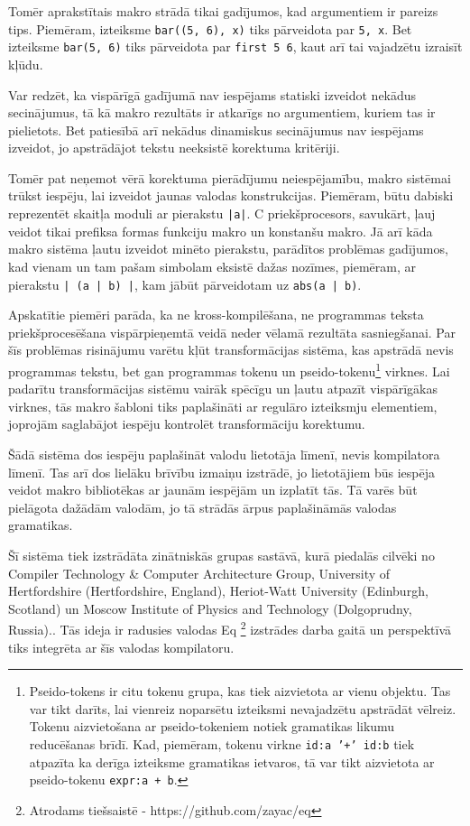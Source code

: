 Tomēr aprakstītais makro strādā tikai gadījumos, kad argumentiem ir pareizs tips. Piemēram, izteiksme \verb|bar((5, 6), x)| tiks pārveidota par \verb|5, x|. Bet izteiksme \verb|bar(5, 6)| tiks pārveidota par \verb|first 5 6|, kaut arī tai vajadzētu izraisīt kļūdu.

Var redzēt, ka vispārīgā gadījumā nav iespējams statiski izveidot nekādus secinājumus, tā kā makro rezultāts ir atkarīgs no argumentiem, kuriem tas ir pielietots. Bet patiesībā arī nekādus dinamiskus secinājumus nav iespējams izveidot, jo apstrādājot tekstu neeksistē korektuma kritēriji.

Tomēr pat neņemot vērā korektuma pierādījumu neiespējamību, makro sistēmai trūkst iespēju, lai izveidot jaunas valodas konstrukcijas. Piemēram, būtu dabiski reprezentēt skaitļa moduli ar pierakstu \verb/|a|/. C priekšprocesors, savukārt, ļauj veidot tikai prefiksa formas funkciju makro un konstanšu makro. Jā arī kāda makro sistēma ļautu izveidot minēto pierakstu, parādītos problēmas gadījumos, kad vienam un tam pašam simbolam eksistē dažas nozīmes, piemēram, ar pierakstu \verb/| (a | b) |/, kam jābūt pārveidotam uz \verb/abs(a | b)/.

Apskatītie piemēri parāda, ka ne kross-kompilēšana, ne programmas teksta priekšprocesēšana vispārpieņemtā veidā neder vēlamā rezultāta sasniegšanai. Par šīs problēmas risinājumu varētu kļūt transformācijas sistēma, kas apstrādā nevis programmas tekstu, bet gan programmas tokenu un pseido-tokenu\footnote{Pseido-tokens ir citu tokenu grupa, kas tiek aizvietota ar vienu objektu. Tas var tikt darīts, lai vienreiz noparsētu izteiksmi nevajadzētu apstrādāt vēlreiz. Tokenu aizvietošana ar pseido-tokeniem notiek gramatikas likumu reducēšanas brīdī. Kad, piemēram, tokenu virkne \texttt{{id:a} '+' {id:b}} tiek atpazīta ka derīga izteiksme gramatikas ietvaros, tā var tikt aizvietota ar pseido-tokenu \texttt{{expr:a + b}}.} virknes. Lai padarītu transformācijas sistēmu vairāk spēcīgu un ļautu atpazīt vispārīgākas virknes, tās makro šabloni tiks paplašināti ar regulāro izteiksmju elementiem, joprojām saglabājot iespēju kontrolēt transformāciju korektumu.

Šādā sistēma dos iespēju paplašināt valodu lietotāja līmenī, nevis kompilatora līmenī. Tas arī dos lielāku brīvību izmaiņu izstrādē, jo lietotājiem būs iespēja veidot makro bibliotēkas ar jaunām iespējām un izplatīt tās. Tā varēs būt pielāgota dažādām valodām, jo tā strādās ārpus paplašināmās valodas gramatikas.

Šī sistēma tiek izstrādāta zinātniskās grupas sastāvā, kurā piedalās cilvēki no Compiler Technology \& Computer Architecture Group, University of Hertfordshire (Hertfordshire, England), Heriot-Watt University (Edinburgh, Scotland) un Moscow Institute of Physics and Technology (Dolgoprudny, Russia).. Tās ideja ir radusies valodas Eq \footnote{Atrodams tiešsaistē - https://github.com/zayac/eq} izstrādes darba gaitā un perspektīvā tiks integrēta ar šīs valodas kompilatoru.